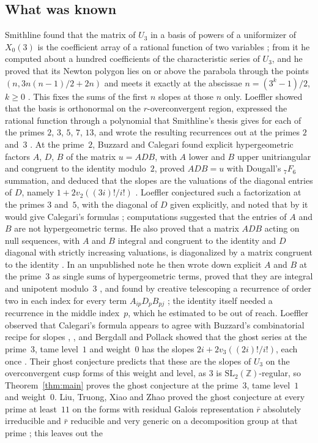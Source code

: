 \documentclass[11pt]{amsart}
\theoremstyle{definition}
\numberwithin{equation}{section}
\newcommand{\Z}{\mathbb{Z}}
\begin{document}
\subsection*{What was known}
Smithline found that the matrix of $U_3$ in a basis of powers of a uniformizer of $X_0(3)$ is the coefficient array of a rational function of two variables \cite[\S4]{Smi04}; from it he computed about a hundred coefficients of the characteristic series of $U_3$, and he proved that its Newton polygon lies on or above the parabola through the points $(n,3n(n-1)/2+2n)$ and meets it exactly at the abscissae $n=(3^k-1)/2$, $k\ge0$ \cite[Proposition~4.2 and Theorem~4.3]{Smi04}. This fixes the sums of the first $n$ slopes at those $n$ only. Loeffler showed that the basis is orthonormal on the $r$-overconvergent region, expressed the rational function through a polynomial that Smithline's thesis gives for each of the primes $2$, $3$, $5$, $7$, $13$, and wrote the resulting recurrences out at the primes $2$ and~$3$ \cite[\S2]{Loe07}. At the prime~$2$, Buzzard and Calegari found explicit hypergeometric factors $A$, $D$, $B$ of the matrix $u=ADB$, with $A$ lower and $B$ upper unitriangular and congruent to the identity modulo~$2$, proved $ADB=u$ with Dougall's ${}_7F_6$ summation, and deduced that the slopes are the valuations of the diagonal entries of $D$, namely $1+2v_2((3i)!/i!)$ \cite[\S2]{BC05}. Loeffler conjectured such a factorization at the primes $3$ and~$5$, with the diagonal of $D$ given explicitly, and noted that by \cite[Lemma~5]{BC05} it would give Calegari's formulas \cite[Conjecture~3.1]{Loe07}; computations suggested that the entries of $A$ and $B$ are not hypergeometric terms. He also proved that a matrix $ADB$ acting on null sequences, with $A$ and $B$ integral and congruent to the identity and $D$ diagonal with strictly increasing valuations, is diagonalized by a matrix congruent to the identity \cite[\S6]{Loe07}. In an unpublished note he then wrote down explicit $A$ and $B$ at the prime~$3$ as single sums of hypergeometric terms, proved that they are integral and unipotent modulo~$3$ \cite[\S3 and Lemma~3.1]{Loe08}, and found by creative telescoping \cite[Chapter~6]{PWZ96} a recurrence of order two in each index for every term $A_{ip}D_pB_{pj}$ \cite[\S4]{Loe08}; the identity itself needed a recurrence in the middle index~$p$, which he estimated to be out of reach. Loeffler observed that Calegari's formula appears to agree with Buzzard's combinatorial recipe for slopes \cite[\S3]{Loe07}, \cite[\S2]{Buz05}, and Bergdall and Pollack showed that the ghost series at the prime~$3$, tame level~$1$ and weight~$0$ has the slopes $2i+2v_3((2i)!/i!)$, each once \cite[\S3]{BP16}. Their ghost conjecture predicts that these are the slopes of $U_3$ on the overconvergent cusp forms of this weight and level, as $3$ is $\mathrm{SL}_2(\Z)$-regular, so Theorem~\ref{thm:main} proves the ghost conjecture at the prime~$3$, tame level~$1$ and weight~$0$. Liu, Truong, Xiao and Zhao proved the ghost conjecture at every prime at least~$11$ on the forms with residual Galois representation $\bar r$ absolutely irreducible and $\bar r$ reducible and very generic on a decomposition group at that prime \cite[\S1.2]{LTXZ23}; this leaves out the 
\end{document}
